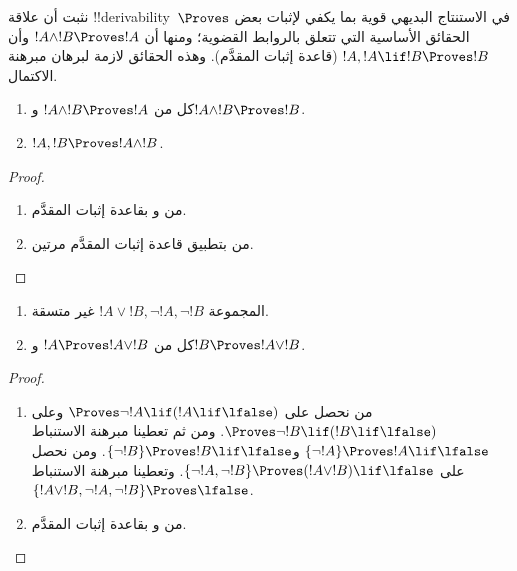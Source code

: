 \documentclass[../../../include/open-logic-section]{subfiles}
\begin{document}
      {}
      {}


\begin{explain}
  نثبت أن علاقة !!{derivability}~$\Proves$ في الاستنتاج البديهي قوية
  بما يكفي لإثبات بعض الحقائق الأساسية التي تتعلق بالروابط القضوية؛
  ومنها أن $!A \land !B \Proves !A$ وأن $!A, !A \lif !B \Proves !B$
  (قاعدة إثبات المقدَّم). وهذه الحقائق لازمة لبرهان مبرهنة الاكتمال.
\end{explain}

\begin{prop}
  \begin{enumerate}
  \item {} كل من $!A \land !B \Proves
    !A$ و$!A \land !B \Proves !B$.
  \item {} $!A, !B \Proves !A \land !B$.
  \end{enumerate}
\end{prop}

\begin{proof}
  \begin{enumerate}
    \item من  و بقاعدة
      إثبات المقدَّم.
  \item من  بتطبيق قاعدة إثبات المقدَّم مرتين.
  \end{enumerate}
\end{proof}


\begin{prop}
  \begin{enumerate}
  \item المجموعة $!A \lor !B, \lnot !A, \lnot !B$ غير متسقة.
  \item كل من $!A \Proves !A \lor !B$ و$!B \Proves !A \lor !B$.
  \end{enumerate}
\end{prop}

\begin{proof}
  \begin{enumerate}
  \item من  نحصل على $\Proves \lnot !A \lif (!A
    \lif \lfalse)$ وعلى $\Proves \lnot !B \lif (!B \lif \lfalse)$.
    ومن ثم تعطينا مبرهنة الاستنباط $\{\lnot !A\} \Proves !A \lif
    \lfalse$ و$\{\lnot !B\} \Proves !B \lif \lfalse$. ومن
     نحصل على $\{\lnot !A, \lnot !B\} \Proves (!A
    \lor !B) \lif \lfalse$. وتعطينا مبرهنة الاستنباط
    $\{!A \lor !B, \lnot !A, \lnot !B\} \Proves \lfalse$.
  \item من  و بقاعدة إثبات
    المقدَّم.
  \end{enumerate}
\end{proof}
\end{document}
